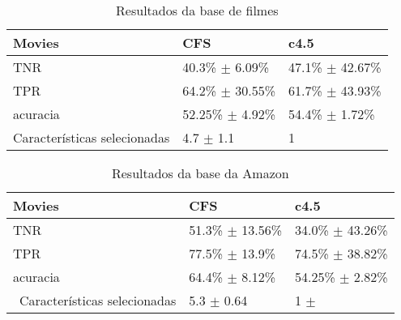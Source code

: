 \documentclass[template.tex]{subfiles}
\begin{document}
\begin{table}[!h]
    \begin{tabular}{lll}
    Movies         				 				& CFS                                 	 	& c4.5                                  \\ \hline
    TNR                   						& 40.3\% $\pm$ 6.09\% 			 	& 47.1\% $\pm$ 42.67\% \\
    TPR                        					& 64.2\% $\pm$ 30.55\% 		    & 61.7\% $\pm$ 43.93\% \\
    acuracia                   				& 52.25\% $\pm$ 4.92\% 			 & 54.4\% $\pm$ 1.72\% \\
    Características selecionadas & 4.7 $\pm$ 1.1            			 	 & 1                                     \\
    \end{tabular}
    \caption{Resultados da base de filmes}
	\label{table:movies}
\end{table}




%

\begin{table}[!h]
    \begin{tabular}{lll}
    Movies         										& CFS                          		& c4.5                                  \\ \hline
    TNR                     								& 51.3\% $\pm$ 13.56\% 	& 34.0\% $\pm$ 43.26\%  \\
    TPR                          						& 77.5\% $\pm$ 13.9\% 		& 74.5\% $\pm$ 38.82\% \\
    acuracia                     					& 64.4\% $\pm$ 8.12\% 		& 54.25\% $\pm$ 2.82\% \\\
    Características selecionadas 		& 5.3 $\pm$ 0.64               & 1 $\pm$                                  \\
    \end{tabular}
    \caption{Resultados da base da Amazon}
	\label{table:amazon}
\end{table}
\end{document}
